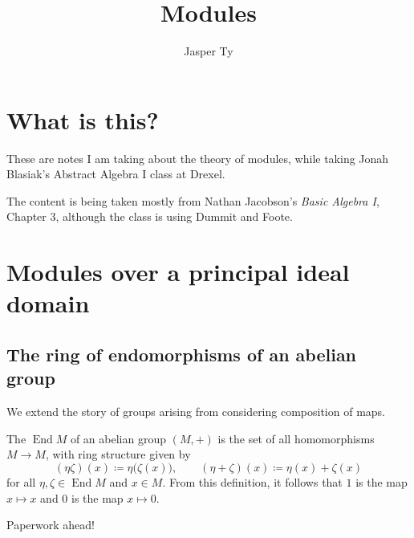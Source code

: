 \documentclass{article}
\title{Modules}
\author{Jasper Ty}
\date{}
\newcommand*\End{\ensuremath{\operatorname{End}}}
\begin{document}
\maketitle


\section*{What is this?}

These are notes I am taking about the theory of modules, while taking Jonah Blasiak's Abstract Algebra I class at Drexel.

The content is being taken mostly from Nathan Jacobson's \textit{Basic Algebra I}, Chapter 3, although the class is using Dummit and Foote.

\tableofcontents

\section{Modules over a principal ideal domain}

\subsection{The ring of endomorphisms of an abelian group}

We extend the story of groups arising from considering composition of maps.

\begin{definition}
    The  $\End M$ of an abelian group $(M, +)$ is the set of all homomorphisms $M \to M$, with ring structure given by 
    \[
        (\eta\zeta)(x)
        \coloneq
        \eta\big(\zeta(x)\big)
        ,\qquad
        (\eta + \zeta)(x)
        \coloneq
        \eta(x) + \zeta(x)
    \]
    for all $\eta, \zeta \in \End M$ and $x \in M$.
    From this definition, it follows that $1$ is the map $x \mapsto x$ and $0$ is the map $x \mapsto 0$.
\end{definition}

Paperwork ahead!
\end{document}
